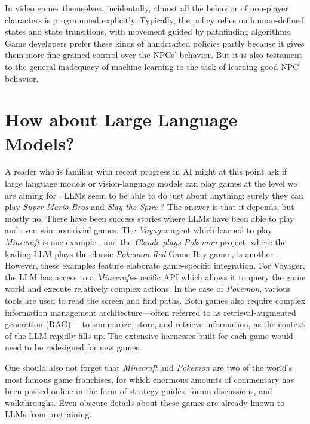\documentclass[runningheads]{llncs}
\begin{document}
In video games themselves, incidentally, almost all the behavior of non-player characters is programmed explicitly. Typically, the policy relies on human-defined states and state transitions, with movement guided by pathfinding algorithms. Game developers prefer these kinds of handcrafted policies partly because it gives them more fine-grained control over the NPCs' behavior. But it is also testament to the general inadequacy of machine learning to the task of learning good NPC behavior.

\section{How about Large Language Models?}

A reader who is familiar with recent progress in AI might at this point ask if large language models or vision-language models can play games at the level we are aiming for \cite{gallotta2024large}. LLMs seem to be able to do just about anything; surely they can play \textit{Super Mario Bros} \cite{super_mario_bros} and \textit{Slay the Spire} \cite{slay_the_spire}? The answer is that it depends, but mostly no. There have been success stories where LLMs have been able to play and even win nontrivial games. The \textit{Voyager} agent which learned to play \textit{Minecraft} \cite{minecraft} is one example \cite{wang2024voyager}, and the \textit{Claude plays Pokemon} project, where the leading LLM plays the classic \textit{Pokemon Red} Game Boy game \cite{pokemon_red}, is another \cite{Pillay2026AI}. However, these examples feature elaborate game-specific integration. For Voyager, the LLM has access to a \textit{Minecraft}-specific API which allows it to query the game world and execute relatively complex actions. In the case of \textit{Pokemon}, various tools are used to read the screen and find paths. Both games also require complex information management architecture---often referred to as retrieval-augmented generation (RAG) \cite{10.5555/3495724.3496517}---to summarize, store, and retrieve information, as the context of the LLM rapidly fills up. The extensive harnesses built for each game would need to be redesigned for new games.

One should also not forget that \textit{Minecraft} and \textit{Pokemon} are two of the world's most famous game franchises, for which enormous amounts of commentary has been posted online in the form of strategy guides, forum discussions, and walkthroughs. Even obscure details about these games are already known to LLMs from pretraining.
\end{document}
